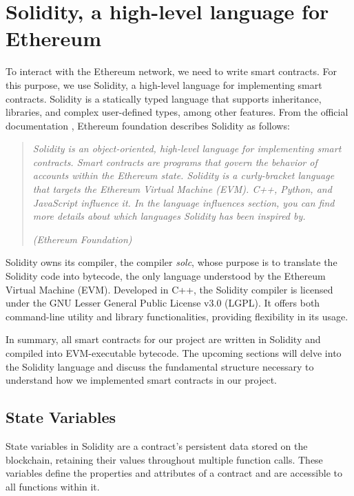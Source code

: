 \section{Solidity, a high-level language for Ethereum}
\label{sec:ch2_solidity}


To interact with the Ethereum network, we need to write smart contracts. For this purpose, we use Solidity, a high-level language for
implementing smart contracts. Solidity is a statically typed language that supports inheritance, libraries, and complex user-defined types, among other features.
From the official documentation \cite{ethereum_solidity_doc}, Ethereum foundation describes Solidity as follows:


\begin{quote}
   \textit{Solidity is an object-oriented, high-level language for implementing smart contracts. Smart contracts are programs that govern the behavior of accounts within the Ethereum state.
       Solidity is a curly-bracket language that targets the Ethereum Virtual Machine (EVM). C++, Python, and JavaScript influence it. In the language influences section, you can find more details about which languages Solidity has been inspired by.}


   \textit{(Ethereum Foundation)}
\end{quote}


Solidity owns its compiler, the compiler \textit{solc}, whose purpose is to translate the Solidity code into bytecode, the only language understood by the Ethereum Virtual Machine (EVM). 
Developed in C++, the Solidity compiler is licensed under the GNU Lesser General Public License v3.0 (LGPL). It offers both command-line utility and library 
functionalities, providing flexibility in its usage.

In summary, all smart contracts for our project are written in Solidity and compiled into EVM-executable bytecode. The upcoming sections will delve into the Solidity 
language and discuss the fundamental structure necessary to understand how we implemented smart contracts in our project.


\subsection{State Variables}

State variables in Solidity are a contract's persistent data stored on the blockchain, retaining their values throughout multiple function calls. These 
variables define the properties and attributes of a contract and are accessible to all functions within it.

